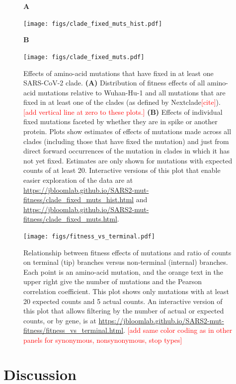 \documentclass[9pt,twocolumn,twoside]{gsajnl_modified}
\newcommand\jdbcomment[1]{\textcolor{red}{[#1]}}
\begin{document}
\begin{figure}
{\bf \Large A}

\texttt{[image: figs/clade\_fixed\_muts\_hist.pdf]}
\vspace{0.05in}

{\bf \Large B}

\texttt{[image: figs/clade\_fixed\_muts.pdf]}

\caption{
Effects of amino-acid mutations that have fixed in at least one SARS-CoV-2 clade.
{\bf (A)}
Distribution of fitness effects of all amino-acid mutations relative to Wuhan-Hu-1 and all mutations that are fixed in at least one of the clades (as defined by Nextclade\jdbcomment{cite}).
\jdbcomment{add vertical line at zero to these plots.}
{\bf (B)}
Effects of individual fixed mutations faceted by whether they are in spike or another protein.
Plots show estimates of effects of mutations made across all clades (including those that have fixed the mutation) and just from direct forward occurrences of the mutation in clades in which it has not yet fixed.
Estimates are only shown for mutations with expected counts of at least 20.
Interactive versions of this plot that enable easier exploration of the data are at \url{https://jbloomlab.github.io/SARS2-mut-fitness/clade_fixed_muts_hist.html} and \url{https://jbloomlab.github.io/SARS2-mut-fitness/clade_fixed_muts.html}.
\label{fig:fixed}
}
\end{figure}

\begin{figure}
\texttt{[image: figs/fitness\_vs\_terminal.pdf]}
\caption{
Relationship between fitness effects of mutations and ratio of counts on terminal (tip) branches versus non-terminal (internal) branches.
Each point is an amino-acid mutation, and the orange text in the upper right give the number of mutations and the Pearson correlation coefficient.
This plot shows only mutations with at least 20 expected counts and 5 actual counts.
An interactive version of this plot that allows filtering by the number of actual or expected counts, or by gene, is at \url{https://jbloomlab.github.io/SARS2-mut-fitness/fitness_vs_terminal.html}.
\jdbcomment{add same color coding as in other panels for synonymous, nonsynonymous, stop types}
\label{fig:terminal}
}
\end{figure}

\section{Discussion}
\end{document}
